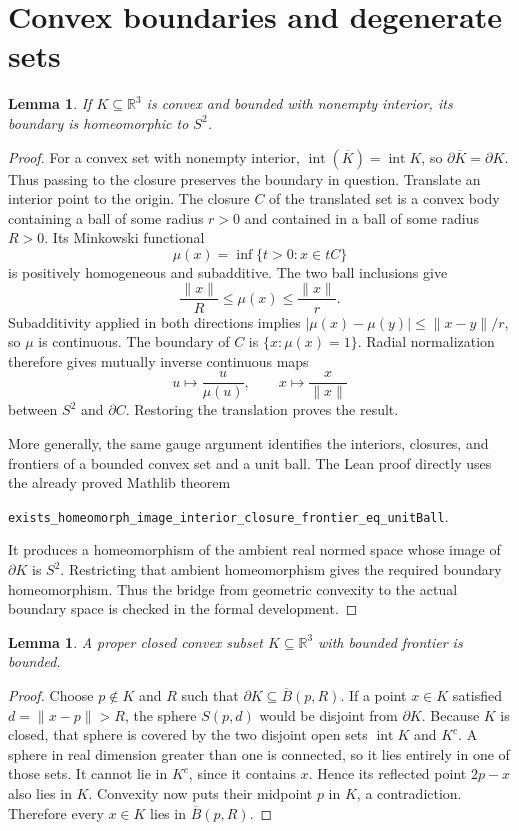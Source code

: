 \documentclass[11pt]{article}
\newtheorem{lemma}[theorem]{Lemma}
\newcommand{\R}{\mathbb R}
\newcommand{\bd}{\partial}
\newcommand{\intr}{\operatorname{int}}
\newcommand{\code}[1]{\texttt{\small #1}}
\begin{document}
\section{Convex boundaries and degenerate sets}
\begin{lemma}\label{lem:convexsphere}
If $K\subseteq\R^3$ is convex and bounded with nonempty interior, its boundary is homeomorphic to $S^2$.
\end{lemma}
\begin{proof}
For a convex set with nonempty interior, $\intr(\overline K)=\intr K$, so $\bd\overline K=\bd K$. Thus passing to the closure preserves the boundary in question. Translate an interior point to the origin. The closure $C$ of the translated set is a convex body containing a ball of some radius $r>0$ and contained in a ball of some radius $R>0$. Its Minkowski functional
\[
 \mu(x)=\inf\{t>0:x\in tC\}
\]
is positively homogeneous and subadditive. The two ball inclusions give
\[
 \frac{\|x\|}{R}\le\mu(x)\le\frac{\|x\|}{r}.
\]
Subadditivity applied in both directions implies
$|\mu(x)-\mu(y)|\le\|x-y\|/r$, so $\mu$ is continuous. The boundary of $C$ is $\{x:\mu(x)=1\}$. Radial normalization therefore gives mutually inverse continuous maps
\[
 u\longmapsto \frac{u}{\mu(u)},\qquad
 x\longmapsto \frac{x}{\|x\|}
\]
between $S^2$ and $\bd C$. Restoring the translation proves the result.

More generally, the same gauge argument identifies the interiors, closures, and frontiers of a bounded convex set and a unit ball. The Lean proof directly uses the already proved Mathlib theorem
\begin{center}
\code{exists\_homeomorph\_image\_interior\_closure\_frontier\_eq\_unitBall}.
\end{center}
It produces a homeomorphism of the ambient real normed space whose image of $\bd K$ is $S^2$. Restricting that ambient homeomorphism gives the required boundary homeomorphism. Thus the bridge from geometric convexity to the actual boundary space is checked in the formal development.
\end{proof}


\begin{lemma}\label{lem:boundedfrontier}
A proper closed convex subset $K\subseteq\R^3$ with bounded frontier is bounded.
\end{lemma}
\begin{proof}
Choose $p\notin K$ and $R$ such that $\bd K\subseteq\overline B(p,R)$. If a point $x\in K$ satisfied $d=\|x-p\|>R$, the sphere $S(p,d)$ would be disjoint from $\bd K$. Because $K$ is closed, that sphere is covered by the two disjoint open sets $\intr K$ and $K^c$. A sphere in real dimension greater than one is connected, so it lies entirely in one of those sets. It cannot lie in $K^c$, since it contains $x$. Hence its reflected point $2p-x$ also lies in $K$. Convexity now puts their midpoint $p$ in $K$, a contradiction. Therefore every $x\in K$ lies in $\overline B(p,R)$.
\end{proof}
\end{document}
